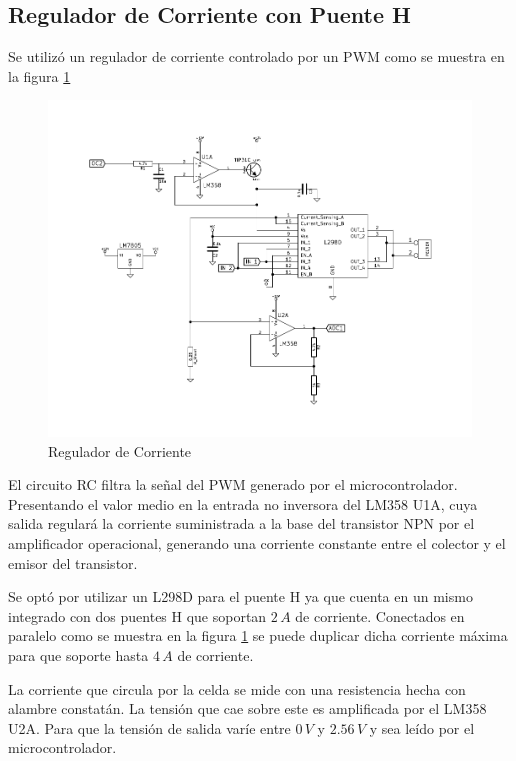 \documentclass[10pt,spanish,a4paper,openany,notitlepage]{article}
\begin{document}
\subsection{Regulador de Corriente con Puente H}

Se utilizó un regulador de corriente controlado por un PWM como se muestra
en la figura \ref{fig:reg_corriente}

\begin{figure}[H] %
\begin{center}
\includegraphics[scale=1]{../circuitos/regulador_corriente.pdf}
\caption{Regulador de Corriente}
 \label{fig:reg_corriente}
\end{center}
\end{figure}

El circuito RC filtra la señal del PWM generado por el
microcontrolador. Presentando el valor medio en la entrada no inversora del LM358 U1A,
cuya salida regulará la corriente suministrada a la
base del transistor NPN por el amplificador operacional, generando una corriente
constante entre el colector y el emisor del transistor.

Se optó por utilizar un L298D para el puente H ya que cuenta en un mismo
integrado con dos puentes H que soportan $2\, \unit{A}$ de corriente. 
Conectados en paralelo como se muestra en la figura \ref{fig:reg_corriente} 
se puede duplicar dicha corriente máxima para que soporte hasta $4\, \unit{A}$ de corriente.

La corriente que circula por la celda se mide con una resistencia hecha con
alambre constatán. La tensión que cae sobre este es amplificada por el LM358 U2A.
Para que la tensión de salida varíe entre $0\, \unit{V}$ y $2.56\, \unit{V}$
y sea leído por el microcontrolador.
\end{document}
